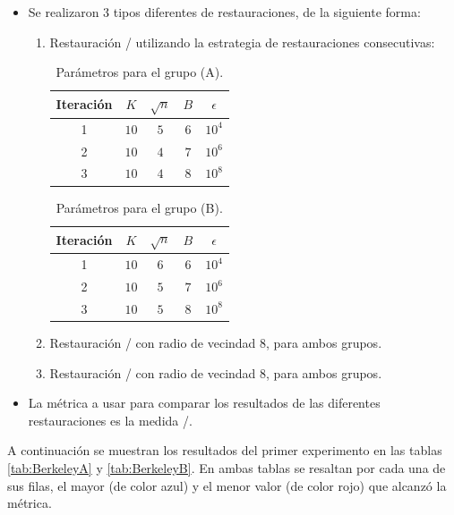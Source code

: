 \begin{itemize}
	\item Se realizaron 3 tipos diferentes de restauraciones, de la siguiente forma:
	\begin{enumerate}
		\item Restauraci\'on \SOP/ utilizando la estrategia de restauraciones consecutivas:
		\begin{table}[H]
			\centering
			\begin{tabular}{|c|cccc|}
				\hline
				Iteraci\'on & $K$ & $\sqrt{n}$ & $B$ & $\epsilon$ \\\hline
				1 & $10$ & $5$ & $6$ & $10^4$\\
				2 & $10$ & $4$ & $7$ & $10^6$\\
				3 & $10$ & $4$ & $8$ & $10^8$\\\hline
			\end{tabular}
			\caption{Par\'ametros para el grupo (A).}
		\end{table}
		\begin{table}[H]
			\centering
			\begin{tabular}{|c|cccc|}
				\hline
				Iteraci\'on & $K$ & $\sqrt{n}$ & $B$ & $\epsilon$ \\\hline
				1 & $10$ & $6$ & $6$ & $10^4$\\
				2 & $10$ & $5$ & $7$ & $10^6$\\
				3 & $10$ & $5$ & $8$ & $10^8$\\\hline
			\end{tabular}
			\caption{Par\'ametros para el grupo (B).}
		\end{table}
		\item Restauraci\'on \TELEA/ con radio de vecindad $8$, para ambos grupos.
		\item Restauraci\'on \NS/ con radio de vecindad $8$, para ambos grupos.
	\end{enumerate}
	\item La m\'etrica a usar para comparar los resultados de las diferentes restauraciones es la medida \PSNR/.
\end{itemize}



A continuaci\'on se muestran los resultados del primer experimento en las tablas \ref{tab:BerkeleyA} y \ref{tab:BerkeleyB}. En ambas tablas se resaltan por cada una de sus filas, el mayor (de color azul) y el menor valor (de color rojo) que alcanz\'o la m\'etrica.

